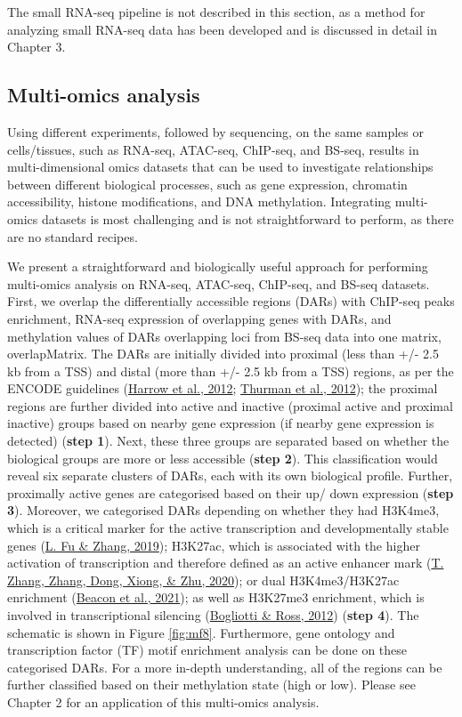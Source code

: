 \documentclass[12pt,twoside]{reedthesis}
\begin{document}
The small RNA-seq pipeline is not described in this section, as a method
for analyzing small RNA-seq data has been developed and is discussed in
detail in Chapter 3.

\hypertarget{m3.7}{%
\subsection*{Multi-omics analysis}\label{m3.7}}

Using different experiments, followed by sequencing, on the same samples
or cells/tissues, such as RNA-seq, ATAC-seq, ChIP-seq, and BS-seq,
results in multi-dimensional omics datasets that can be used to
investigate relationships between different biological processes, such
as gene expression, chromatin accessibility, histone modifications, and
DNA methylation. Integrating multi-omics datasets is most challenging
and is not straightforward to perform, as there are no standard recipes.

We present a straightforward and biologically useful approach for
performing multi-omics analysis on RNA-seq, ATAC-seq, ChIP-seq, and
BS-seq datasets. First, we overlap the differentially accessible regions
(DARs) with ChIP-seq peaks enrichment, RNA-seq expression of overlapping
genes with DARs, and methylation values of DARs overlapping loci from
BS-seq data into one matrix, overlapMatrix. The DARs are initially
divided into proximal (less than +/- 2.5 kb from a TSS) and distal (more
than +/- 2.5 kb from a TSS) regions, as per the ENCODE guidelines
(\protect\hyperlink{ref-harrow2012}{Harrow et al., 2012}; \protect\hyperlink{ref-thurman2012}{Thurman et al., 2012}); the proximal regions are further divided
into active and inactive (proximal active and proximal inactive) groups
based on nearby gene expression (if nearby gene expression is detected)
(\textbf{step 1}). Next, these three groups are separated based on whether
the biological groups are more or less accessible (\textbf{step 2}). This
classification would reveal six separate clusters of DARs, each with its
own biological profile. Further, proximally active genes are categorised
based on their up/ down expression (\textbf{step 3}). Moreover, we
categorised DARs depending on whether they had H3K4me3, which is a
critical marker for the active transcription and developmentally stable
genes (\protect\hyperlink{ref-fu2019}{L. Fu \& Zhang, 2019}); H3K27ac, which is associated with the higher activation
of transcription and therefore defined as an active enhancer mark
(\protect\hyperlink{ref-zhang2020}{T. Zhang, Zhang, Dong, Xiong, \& Zhu, 2020}); or dual H3K4me3/H3K27ac enrichment (\protect\hyperlink{ref-beacon2021}{Beacon et al., 2021}); as well
as H3K27me3 enrichment, which is involved in transcriptional silencing
(\protect\hyperlink{ref-bogliotti2012}{Bogliotti \& Ross, 2012}) (\textbf{step 4}). The schematic is shown in Figure \ref{fig:mf8}. Furthermore, gene ontology and
transcription factor (TF) motif enrichment analysis can be done on these
categorised DARs. For a more in-depth understanding, all of the regions
can be further classified based on their methylation state (high or
low). Please see Chapter 2 for an application of this multi-omics
analysis.
\end{document}
